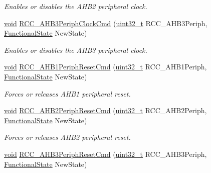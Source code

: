 \begin{DoxyCompactItemize}
\begin{DoxyCompactList}\small\item\em Enables or disables the A\-H\-B2 peripheral clock. \end{DoxyCompactList}\item 
\hyperlink{group___n_a_m_e_ga18028b8badbf1ea7e704ccac3c488e82}{void} \hyperlink{group___r_c_c___group3_ga4eb8c119f2e9bf2bd2e042d27f151338}{R\-C\-C\-\_\-\-A\-H\-B3\-Periph\-Clock\-Cmd} (\hyperlink{stdint_8h_a435d1572bf3f880d55459d9805097f62}{uint32\-\_\-t} R\-C\-C\-\_\-\-A\-H\-B3\-Periph, \hyperlink{group___exported__types_gac9a7e9a35d2513ec15c3b537aaa4fba1}{Functional\-State} New\-State)
\begin{DoxyCompactList}\small\item\em Enables or disables the A\-H\-B3 peripheral clock. \end{DoxyCompactList}\item 
\hyperlink{group___n_a_m_e_ga18028b8badbf1ea7e704ccac3c488e82}{void} \hyperlink{group___r_c_c___group3_gaa7c450567f4731d4f0615f63586cad86}{R\-C\-C\-\_\-\-A\-H\-B1\-Periph\-Reset\-Cmd} (\hyperlink{stdint_8h_a435d1572bf3f880d55459d9805097f62}{uint32\-\_\-t} R\-C\-C\-\_\-\-A\-H\-B1\-Periph, \hyperlink{group___exported__types_gac9a7e9a35d2513ec15c3b537aaa4fba1}{Functional\-State} New\-State)
\begin{DoxyCompactList}\small\item\em Forces or releases A\-H\-B1 peripheral reset. \end{DoxyCompactList}\item 
\hyperlink{group___n_a_m_e_ga18028b8badbf1ea7e704ccac3c488e82}{void} \hyperlink{group___r_c_c___group3_gafb119d6d1955d1b8c361e8140845ac5a}{R\-C\-C\-\_\-\-A\-H\-B2\-Periph\-Reset\-Cmd} (\hyperlink{stdint_8h_a435d1572bf3f880d55459d9805097f62}{uint32\-\_\-t} R\-C\-C\-\_\-\-A\-H\-B2\-Periph, \hyperlink{group___exported__types_gac9a7e9a35d2513ec15c3b537aaa4fba1}{Functional\-State} New\-State)
\begin{DoxyCompactList}\small\item\em Forces or releases A\-H\-B2 peripheral reset. \end{DoxyCompactList}\item 
\hyperlink{group___n_a_m_e_ga18028b8badbf1ea7e704ccac3c488e82}{void} \hyperlink{group___r_c_c___group3_gaee44f159a1ca9ebdd7117bff387cd592}{R\-C\-C\-\_\-\-A\-H\-B3\-Periph\-Reset\-Cmd} (\hyperlink{stdint_8h_a435d1572bf3f880d55459d9805097f62}{uint32\-\_\-t} R\-C\-C\-\_\-\-A\-H\-B3\-Periph, \hyperlink{group___exported__types_gac9a7e9a35d2513ec15c3b537aaa4fba1}{Functional\-State} New\-State)

\end{DoxyCompactItemize}
